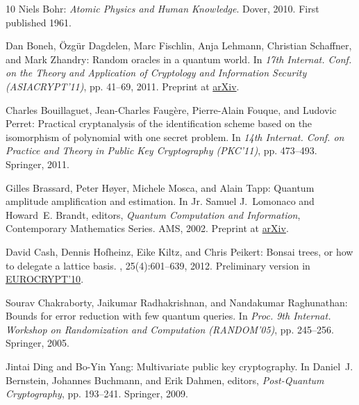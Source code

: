 \begin{thebibliography}{10}
{\sc Niels Bohr}: {\em Atomic Physics and Human Knowledge}.
\newblock Dover, 2010.
\newblock First published 1961.

{\sc Dan Boneh, \"{O}zg\"{u}r Dagdelen, Marc Fischlin, Anja Lehmann, Christian
  Schaffner, and Mark Zhandry}: Random oracles in a quantum world.
\newblock In {\em 17th Internat. Conf. on the Theory and Application of
  Cryptology and Information Security (ASIACRYPT'11)}, pp. 41--69, 2011.
\newblock Preprint at \href{http://arxiv.org/abs/1008.0931}{arXiv}.
\newblock [\epfmtdoi{10.1007/978-3-642-25385-0\_3}]

{\sc Charles Bouillaguet, Jean-Charles Faug\`{e}re, Pierre-Alain Fouque, and
  Ludovic Perret}: Practical cryptanalysis of the identification scheme based
  on the isomorphism of polynomial with one secret problem.
\newblock In {\em 14th Internat. Conf. on Practice and Theory in Public Key
  Cryptography (PKC'11)}, pp. 473--493. Springer, 2011.
\newblock [\epfmtdoi{10.1007/978-3-642-19379-8\_29}]

{\sc Gilles Brassard, Peter H{\o}yer, Michele Mosca, and Alain Tapp}: Quantum
  amplitude amplification and estimation.
\newblock In {\sc Jr. Samuel J.~Lomonaco and Howard~E. Brandt}, editors, {\em
  Quantum Computation and Information}, Contemporary Mathematics Series. AMS,
  2002.
\newblock Preprint at \href{http://arxiv.org/abs/quant-ph/0005055}{arXiv}.

{\sc David Cash, Dennis Hofheinz, Eike Kiltz, and Chris Peikert}: Bonsai trees,
  or how to delegate a lattice basis.
, 25(4):601--639, 2012.
\newblock Preliminary version in
  \href{http://dx.doi.org/10.1007/978-3-642-13190-5_27}{EUROCRYPT'10}.
\newblock [\epfmtdoi{10.1007/s00145-011-9105-2}]

{\sc Sourav Chakraborty, Jaikumar Radhakrishnan, and Nandakumar Raghunathan}:
  Bounds for error reduction with few quantum queries.
\newblock In {\em Proc. 9th Internat. Workshop on Randomization and Computation
  (RANDOM'05)}, pp. 245--256. Springer, 2005.
\newblock [\epfmtdoi{10.1007/11538462\_21}]

{\sc Jintai Ding and Bo-Yin Yang}: Multivariate public key cryptography.
\newblock In {\sc Daniel~J. Bernstein, Johannes Buchmann, and Erik Dahmen},
  editors, {\em Post-Quantum Cryptography}, pp. 193--241. Springer, 2009.
\newblock [\epfmtdoi{10.1007/978-3-540-88702-7\_6}]


\end{thebibliography}
